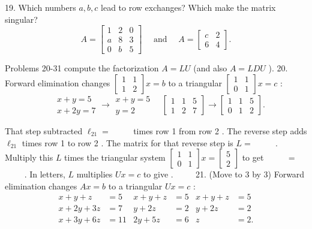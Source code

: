 

19. Which numbers $a, b, c$ lead to row exchanges? Which make the matrix singular?
$$
A=\left[\begin{array}{lll}
1 & 2 & 0 \\
a & 8 & 3 \\
0 & b & 5
\end{array}\right] \quad \text { and } \quad A=\left[\begin{array}{ll}
c & 2 \\
6 & 4
\end{array}\right] .
$$

Problems 20-31 compute the factorization $A=L U$ (and also $A=L D U$ ).
20. Forward elimination changes $\left[\begin{array}{ll}1 & 1 \\ 1 & 2\end{array}\right] x=b$ to a triangular $\left[\begin{array}{ll}1 & 1 \\ 0 & 1\end{array}\right] x=c$ :
$$
\begin{aligned}
& x+y=5 \\
& x+2 y=7
\end{aligned} \rightarrow \begin{array}{r}
x+y=5 \\
y=2
\end{array} \quad\left[\begin{array}{lll}
1 & 1 & 5 \\
1 & 2 & 7
\end{array}\right] \rightarrow\left[\begin{array}{lll}
1 & 1 & 5 \\
0 & 1 & 2
\end{array}\right] .
$$

That step subtracted $\ell_{21}=$ $\qquad$ times row 1 from row 2 . The reverse step adds $\ell_{21}$ times row 1 to row 2 . The matrix for that reverse step is $L=$ $\qquad$ . Multiply this $L$ times the triangular system $\left[\begin{array}{ll}1 & 1 \\ 0 & 1\end{array}\right] x=\left[\begin{array}{l}5 \\ 2\end{array}\right]$ to get $\qquad$ $=$ $\qquad$ . In letters, $L$ multiplies $U x=c$ to give . $\qquad$
21. (Move to 3 by 3) Forward elimination changes $A x=b$ to a triangular $U x=c$ :
$$
\begin{array}{rlrlrl}
x+y+z & =5 & x+y+z & =5 & x+y+z & =5 \\
x+2 y+3 z & =7 & y+2 z & =2 & y+2 z & =2 \\
x+3 y+6 z & =11 & 2 y+5 z & =6 & z & =2 .
\end{array}
$$

